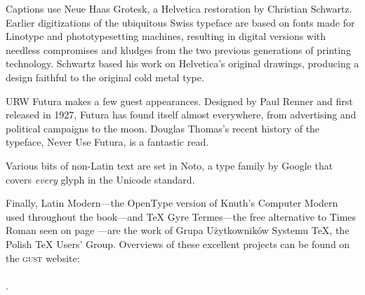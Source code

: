 Captions use
\textsf{\small Neue Haas Grotesk},
a Helvetica restoration by Christian Schwartz.
Earlier digitizations of the ubiquitous Swiss typeface are based on fonts
made for Linotype and phototypesetting machines,
resulting in digital versions with needless compromises and kludges from the
two previous generations of printing technology.
Schwartz based his work on Helvetica's original drawings,
producing a design faithful to the original cold metal type.

{URW Futura}
makes a few guest appearances.
Designed by Paul Renner and first released in 1927,
Futura has found itself almost everywhere,
from advertising and political campaigns to the moon.
Douglas Thomas's recent history of the typeface,
{Never Use Futura},
is a fantastic read.

Various bits of non-Latin text are set in
{Noto},
a type family by Google that covers \emph{every} glyph
in the Unicode standard.

Finally,
{\lm Latin Modern}---the OpenType version of Knuth's Computer Modern used throughout
the book---and
{\TeX{} Gyre Termes}---the
free alternative to Times Roman seen on page \pageref{typography}---are the
work of Grupa Użytkowników Systemu \TeX{}, the Polish \TeX{} Users' Group.
Overviews of these excellent projects can be found
on the \textsc{gust} website:\\
 \\
.
